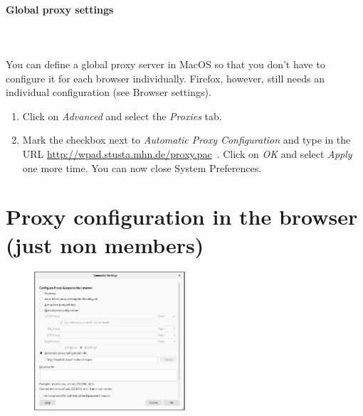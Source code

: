 \documentclass[a4paper,12pt]{scrartcl}
\begin{document}
\paragraph*{Global proxy settings}~\\
\\
You can define a global proxy server in MacOS so that you don't have to configure it for each browser individually. Firefox, however, still needs an individual configuration (see Browser settings).
\begin{enumerate}
	\item Click on \emph{Advanced} and select the \emph{Proxies} tab.
	\item Mark the checkbox next to \emph{Automatic Proxy Configuration} and type in the URL \url{http://wpad.stusta.mhn.de/proxy.pac}\ . Click on \emph{OK} and select \emph{Apply} one more time. You can now close System Preferences.
\end{enumerate}

\newpage

\section*{Proxy configuration in the browser (just non members)}

\begin{figure}
	\vspace{-40pt}
	\begin{center}
		\includegraphics[width=0.5\textwidth,keepaspectratio]{Bilder/firefox_en_stusta}
	\end{center}
\end{figure}
\end{document}
